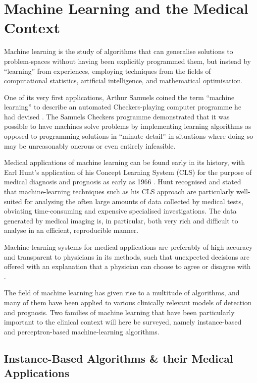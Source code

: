 \section{Machine Learning and the Medical Context}

Machine learning is the study of algorithms that can generalise solutions to problem-spaces without having been explicitly programmed them, but instead by ``learning'' from experiences, employing techniques from the fields of computational statistics, artificial intelligence, and mathematical optimisation.

One of its very first applications, Arthur Samuels coined the term ``machine learning'' to describe an automated Checkers-playing computer programme he had devised \citep{samuel_draughts}. The Samuels Checkers programme demonstrated that it was possible to have machines solve problems by implementing learning algorithms as opposed to programming solutions in ``minute detail'' in situations where doing so may be unreasonably onerous or even entirely infeasible.

Medical applications of machine learning can be found early in its history, with Earl Hunt's application of his Concept Learning System (CLS) for the purpose of medical diagnosis and prognosis as early as 1966 \citep{hunt1966}. Hunt recognised and stated that machine-learning techniques such as his CLS approach are particularly well-suited for analysing the often large amounts of data collected by medical tests, obviating time-consuming and expensive specialised investigations. The data generated by medical imaging is, in particular, both very rich and difficult to analyse in an efficient, reproducible manner.

Machine-learning systems for medical applications are preferably of high accuracy and transparent to physicians in its methods, such that unexpected decisions are offered with an explanation that a physician can choose to agree or disagree with \citep{med_ml_review}.

The field of machine learning has given rise to a multitude of algorithms, and many of them have been applied to various clinically relevant models of detection and prognosis. Two families of machine learning that have been particularly important to the clinical context will here be surveyed, namely instance-based and perceptron-based machine-learning algorithms.

\subsection{Instance-Based Algorithms \& their Medical Applications}

